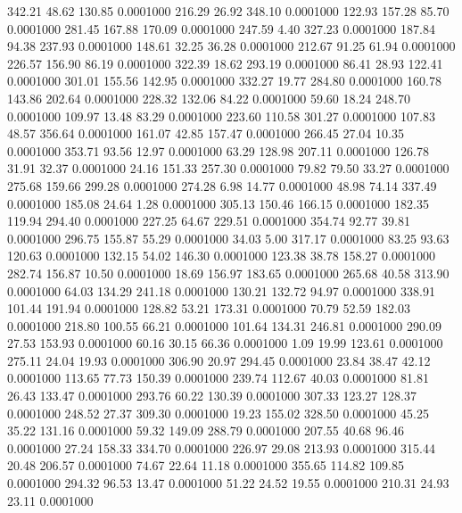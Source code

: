  342.21   48.62  130.85   0.0001000
 216.29   26.92  348.10   0.0001000
 122.93  157.28   85.70   0.0001000
 281.45  167.88  170.09   0.0001000
 247.59    4.40  327.23   0.0001000
 187.84   94.38  237.93   0.0001000
 148.61   32.25   36.28   0.0001000
 212.67   91.25   61.94   0.0001000
 226.57  156.90   86.19   0.0001000
 322.39   18.62  293.19   0.0001000
  86.41   28.93  122.41   0.0001000
 301.01  155.56  142.95   0.0001000
 332.27   19.77  284.80   0.0001000
 160.78  143.86  202.64   0.0001000
 228.32  132.06   84.22   0.0001000
  59.60   18.24  248.70   0.0001000
 109.97   13.48   83.29   0.0001000
 223.60  110.58  301.27   0.0001000
 107.83   48.57  356.64   0.0001000
 161.07   42.85  157.47   0.0001000
 266.45   27.04   10.35   0.0001000
 353.71   93.56   12.97   0.0001000
  63.29  128.98  207.11   0.0001000
 126.78   31.91   32.37   0.0001000
  24.16  151.33  257.30   0.0001000
  79.82   79.50   33.27   0.0001000
 275.68  159.66  299.28   0.0001000
 274.28    6.98   14.77   0.0001000
  48.98   74.14  337.49   0.0001000
 185.08   24.64    1.28   0.0001000
 305.13  150.46  166.15   0.0001000
 182.35  119.94  294.40   0.0001000
 227.25   64.67  229.51   0.0001000
 354.74   92.77   39.81   0.0001000
 296.75  155.87   55.29   0.0001000
  34.03    5.00  317.17   0.0001000
  83.25   93.63  120.63   0.0001000
 132.15   54.02  146.30   0.0001000
 123.38   38.78  158.27   0.0001000
 282.74  156.87   10.50   0.0001000
  18.69  156.97  183.65   0.0001000
 265.68   40.58  313.90   0.0001000
  64.03  134.29  241.18   0.0001000
 130.21  132.72   94.97   0.0001000
 338.91  101.44  191.94   0.0001000
 128.82   53.21  173.31   0.0001000
  70.79   52.59  182.03   0.0001000
 218.80  100.55   66.21   0.0001000
 101.64  134.31  246.81   0.0001000
 290.09   27.53  153.93   0.0001000
  60.16   30.15   66.36   0.0001000
   1.09   19.99  123.61   0.0001000
 275.11   24.04   19.93   0.0001000
 306.90   20.97  294.45   0.0001000
  23.84   38.47   42.12   0.0001000
 113.65   77.73  150.39   0.0001000
 239.74  112.67   40.03   0.0001000
  81.81   26.43  133.47   0.0001000
 293.76   60.22  130.39   0.0001000
 307.33  123.27  128.37   0.0001000
 248.52   27.37  309.30   0.0001000
  19.23  155.02  328.50   0.0001000
  45.25   35.22  131.16   0.0001000
  59.32  149.09  288.79   0.0001000
 207.55   40.68   96.46   0.0001000
  27.24  158.33  334.70   0.0001000
 226.97   29.08  213.93   0.0001000
 315.44   20.48  206.57   0.0001000
  74.67   22.64   11.18   0.0001000
 355.65  114.82  109.85   0.0001000
 294.32   96.53   13.47   0.0001000
  51.22   24.52   19.55   0.0001000
 210.31   24.93   23.11   0.0001000
